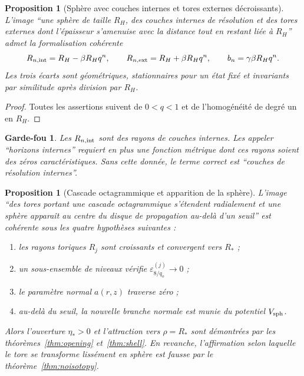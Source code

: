 \documentclass[11pt,a4paper]{article}
\newtheorem{proposition}[theorem]{Proposition}
\newtheorem{guardrail}[theorem]{Garde-fou}
\newcommand{\eps}{\varepsilon}
\begin{document}
\begin{proposition}[Sphère avec couches internes et tores externes décroissants]\label{prop:user-upper}
L'image ``une sphère de taille $R_H$, des couches internes de résolution et des tores externes dont l'épaisseur s'amenuise avec la distance tout en restant liée à $R_H$'' admet la formalisation cohérente
\[
 R_{n,\rm int}=R_H-\beta R_Hq^n,
 \qquad
 R_{n,\rm ext}=R_H+\beta R_Hq^n,
 \qquad
 b_n=\gamma\beta R_Hq^n.
\]
Les trois écarts sont géométriques, stationnaires pour un état fixé et invariants par similitude après division par $R_H$.
\end{proposition}

\begin{proof}
Toutes les assertions suivent de $0<q<1$ et de l'homogénéité de degré un en $R_H$.
\end{proof}

\begin{guardrail}
Les $R_{n,\rm int}$ sont des rayons de couches internes. Les appeler ``horizons internes'' requiert en plus une fonction métrique dont ces rayons soient des zéros caractéristiques. Sans cette donnée, le terme correct est ``couches de résolution internes''.
\end{guardrail}

\begin{proposition}[Cascade octagrammique et apparition de la sphère]\label{prop:user-lower}
L'image ``des tores portant une cascade octagrammique s'étendent radialement et une sphère apparaît au centre du disque de propagation au-delà d'un seuil'' est cohérente sous les quatre hypothèses suivantes :
\begin{enumerate}[label=\textup{(\roman*)}]
\item les rayons toriques $R_j$ sont croissants et convergent vers $R_*$ ;
\item un sous-ensemble de niveaux vérifie $\eps_{8/q_o}^{(j)}\to0$ ;
\item le paramètre normal $a(r,z)$ traverse zéro ;
\item au-delà du seuil, la nouvelle branche normale est munie du potentiel $V_{\rm sph}$.
\end{enumerate}
Alors l'ouverture $\eta_*>0$ et l'attraction vers $\rho=R_*$ sont démontrées par les théorèmes~\ref{thm:opening} et~\ref{thm:shell}. En revanche, l'affirmation selon laquelle le tore se transforme lissément en sphère est fausse par le théorème~\ref{thm:noisotopy}.
\end{proposition}
\end{document}
